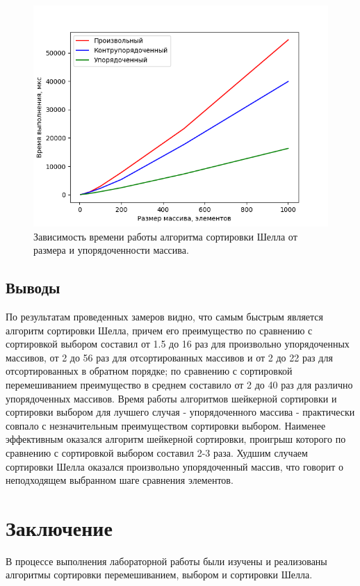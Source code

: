 \documentclass[a4paper,oneside,14pt]{extreport}
\begin{document}
\begin{figure}[H]
	\centering
	\includegraphics[width=1\linewidth]{images/shell_graph}
	\caption{Зависимость времени работы алгоритма сортировки Шелла от размера и упорядоченности массива.}
	\label{fig:shell_gr}
\end{figure}

\section{Выводы}
По результатам проведенных замеров видно, что самым быстрым является алгоритм сортировки Шелла, причем его преимущество по сравнению с сортировкой выбором составил от 1.5 до 16 раз для произвольно упорядоченных массивов, от 2 до 56 раз для отсортированных массивов и от 2 до 22 раз для отсортированных в обратном порядке; по сравнению с сортировкой перемешиванием преимущество в среднем составило от 2 до 40 раз для различно упорядоченных массивов. Время работы алгоритмов шейкерной сортировки и сортировки выбором для лучшего случая - упорядоченного массива - практически совпало с незначительным преимуществом сортировки выбором. Наименее эффективным оказался алгоритм шейкерной сортировки, проигрыш которого по сравнению с сортировкой выбором составил 2-3 раза. Худшим случаем сортировки Шелла оказался произвольно упорядоченный массив, что говорит о неподходящем выбранном шаге сравнения элементов. 
\newpage

\chapter*{Заключение}
В процессе выполнения лабораторной работы были изучены и реализованы алгоритмы сортировки перемешиванием, выбором и сортировки Шелла.
\end{document}
